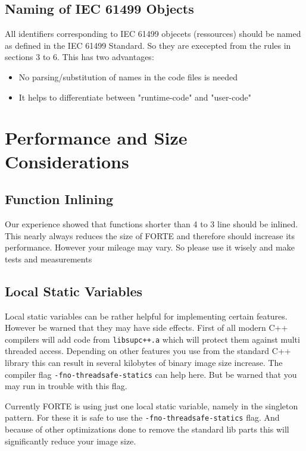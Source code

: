 \documentclass[final,a4paper,10pt, oneside]{article}
\begin{document}
\subsection{Naming of IEC 61499 Objects}

All identifiers corresponding to IEC 61499 objecets (ressources) should be named as defined
in the IEC 61499 Standard. So they are execepted from the rules in sections 3 to 6. This has two advantages:
\begin{itemize}
\item No parsing/substitution of names in the code files is needed
\item It helps to differentiate between "runtime-code" and "user-code"
\end{itemize}

\section{Performance and Size Considerations}



\subsection{Function Inlining}
Our experience showed that functions shorter than 4 to 3 line should be inlined. This nearly always reduces the size of FORTE and therefore should increase its performance. However your mileage may vary. So please use it wisely and make tests and measurements


\subsection{Local Static Variables}
Local static variables can be rather helpful for implementing certain features. However be warned that they may have side effects. First of all modern C++ compilers will add code from \verb=libsupc++.a= which will protect them against multi threaded access. Depending on other features you use from the standard C++ library this can result in several kilobytes of binary image size increase. The compiler flag \verb=-fno-threadsafe-statics= can help here. But be warned that you may run in trouble with this flag. 

Currently FORTE is using just one local static variable, namely in the singleton pattern. For these it is safe to use the \verb=-fno-threadsafe-statics= flag. And because of other optimizations done to remove the standard lib parts this will significantly reduce your image size. 
\end{document}
